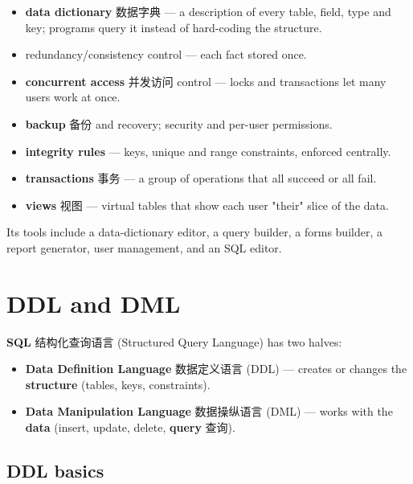 \documentclass[11pt]{article}
\begin{document}
\begin{itemize}
\item \textbf{data dictionary} 数据字典 — a description of every table, field, type and key; programs query it instead of hard-coding the structure.

\item redundancy/consistency control — each fact stored once.

\item \textbf{concurrent access} 并发访问 control — locks and transactions let many users work at once.

\item \textbf{backup} 备份 and recovery; security and per-user permissions.

\item \textbf{integrity rules} — keys, unique and range constraints, enforced centrally.

\item \textbf{transactions} 事务 — a group of operations that all succeed or all fail.

\item \textbf{views} 视图 — virtual tables that show each user "their" slice of the data.

\end{itemize}

Its tools include a data-dictionary editor, a query builder, a forms builder, a report generator, user management, and an SQL editor.

\section*{DDL and DML}

\textbf{SQL} 结构化查询语言 (Structured Query Language) has two halves:

\begin{itemize}
\item \textbf{Data Definition Language} 数据定义语言 (DDL) — creates or changes the \textbf{structure} (tables, keys, constraints).

\item \textbf{Data Manipulation Language} 数据操纵语言 (DML) — works with the \textbf{data} (insert, update, delete, \textbf{query} 查询).

\end{itemize}

\subsection*{DDL basics}
\end{document}
